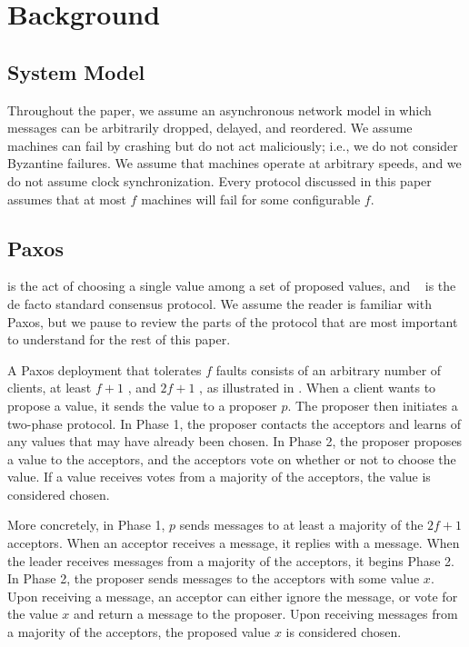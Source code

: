 \section{Background}

\subsection{System Model}
Throughout the paper, we assume an asynchronous network model in which messages
can be arbitrarily dropped, delayed, and reordered. We assume machines can fail
by crashing but do not act maliciously; i.e., we do not consider Byzantine
failures. We assume that machines operate at arbitrary speeds, and we do not
assume clock synchronization. Every protocol discussed in this paper assumes
that at most $f$ machines will fail for some configurable $f$.

\subsection{Paxos}
 is the act of choosing a single value among a set of
proposed values, and ~\cite{lamport1998part} is the de facto
standard consensus protocol. We assume the reader is familiar with Paxos, but
we pause to review the parts of the protocol that are most important to
understand for the rest of this paper.

A Paxos deployment that tolerates $f$ faults consists of an arbitrary number of
clients, at least $f+1$ , and $2f+1$ , as
illustrated in . When a client wants to propose
a value, it sends the value to a proposer $p$. The proposer then initiates a
two-phase protocol. In Phase 1, the proposer contacts the acceptors and learns
of any values that may have already been chosen. In Phase 2, the proposer
proposes a value to the acceptors, and the acceptors vote on whether or not to
choose the value. If a value receives votes from a majority of the acceptors,
the value is considered chosen.

More concretely, in Phase 1, $p$ sends  messages to at least a
majority of the $2f+1$ acceptors. When an acceptor receives a 
message, it replies with a  message. When the leader receives
 messages from a majority of the acceptors, it begins Phase 2.
%
In Phase 2, the proposer sends  messages to the acceptors with
some value $x$. Upon receiving a  message, an acceptor can
either ignore the message, or vote for the value $x$ and return a
 message to the proposer. Upon receiving 
messages from a majority of the acceptors, the proposed value $x$ is considered
chosen.

